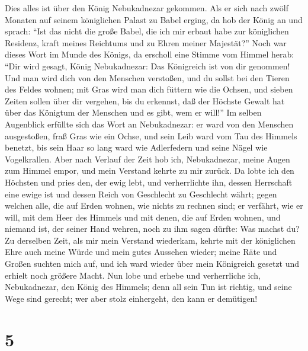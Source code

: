  Dies alles ist über den König Nebukadnezar gekommen.
 Als er sich nach zwölf Monaten auf seinem königlichen
Palast zu Babel erging,  da hob der König an und sprach:
``Ist das nicht die große Babel, die ich mir erbaut habe zur königlichen
Residenz, kraft meines Reichtums und zu Ehren meiner Majestät?''
 Noch war dieses Wort im Munde des Königs, da erscholl
eine Stimme vom Himmel herab: ``Dir wird gesagt, König Nebukadnezar: Das
Königreich ist von dir genommen!  Und man wird dich von
den Menschen verstoßen, und du sollst bei den Tieren des Feldes wohnen;
mit Gras wird man dich füttern wie die Ochsen, und sieben Zeiten sollen
über dir vergehen, bis du erkennst, daß der Höchste Gewalt hat über das
Königtum der Menschen und es gibt, wem er will!''  Im
selben Augenblick erfüllte sich das Wort an Nebukadnezar: er ward von
den Menschen ausgestoßen, fraß Gras wie ein Ochse, und sein Leib ward
vom Tau des Himmels benetzt, bis sein Haar so lang ward wie Adlerfedern
und seine Nägel wie Vogelkrallen.  Aber nach Verlauf der
Zeit hob ich, Nebukadnezar, meine Augen zum Himmel empor, und mein
Verstand kehrte zu mir zurück. Da lobte ich den Höchsten und pries den,
der ewig lebt, und verherrlichte ihn, dessen Herrschaft eine ewige ist
und dessen Reich von Geschlecht zu Geschlecht währt; 
gegen welchen alle, die auf Erden wohnen, wie nichts zu rechnen sind; er
verfährt, wie er will, mit dem Heer des Himmels und mit denen, die auf
Erden wohnen, und niemand ist, der seiner Hand wehren, noch zu ihm sagen
dürfte: Was machst du?  Zu derselben Zeit, als mir mein
Verstand wiederkam, kehrte mit der königlichen Ehre auch meine Würde und
mein gutes Aussehen wieder; meine Räte und Großen suchten mich auf, und
ich ward wieder über mein Königreich gesetzt und erhielt noch größere
Macht.  Nun lobe und erhebe und verherrliche ich,
Nebukadnezar, den König des Himmels; denn all sein Tun ist richtig, und
seine Wege sind gerecht; wer aber stolz einhergeht, den kann er
demütigen!

\hypertarget{section-4}{%
\section{5}\label{section-4}}

